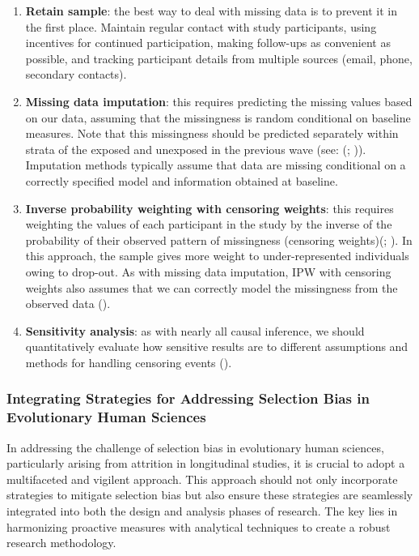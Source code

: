 \documentclass[
  singlecolumn,
  9pt]{article}
\begin{document}
\begin{enumerate}
\def\labelenumi{\arabic{enumi}.}
\item
  \textbf{Retain sample}: the best way to deal with missing data is to
  prevent it in the first place. Maintain regular contact with study
  participants, using incentives for continued participation, making
  follow-ups as convenient as possible, and tracking participant details
  from multiple sources (email, phone, secondary contacts).
\item
  \textbf{Missing data imputation}: this requires predicting the missing
  values based on our data, assuming that the missingness is random
  conditional on baseline measures. Note that this missingness should be
  predicted separately within strata of the exposed and unexposed in the
  previous wave (see: (; )).
  Imputation methods typically assume that data are missing conditional
  on a correctly specified model and information obtained at baseline.
\item
  \textbf{Inverse probability weighting with censoring weights}: this
  requires weighting the values of each participant in the study by the
  inverse of the probability of their observed pattern of missingness
  (censoring weights)(;
  ). In this approach, the
  sample gives more weight to under-represented individuals owing to
  drop-out. As with missing data imputation, IPW with censoring weights
  also assumes that we can correctly model the missingness from the
  observed data ().
\item
  \textbf{Sensitivity analysis}: as with nearly all causal inference, we
  should quantitatively evaluate how sensitive results are to different
  assumptions and methods for handling censoring events
  ().
\end{enumerate}

\subsubsection{Integrating Strategies for Addressing Selection Bias in
Evolutionary Human
Sciences}\label{integrating-strategies-for-addressing-selection-bias-in-evolutionary-human-sciences}

In addressing the challenge of selection bias in evolutionary human
sciences, particularly arising from attrition in longitudinal studies,
it is crucial to adopt a multifaceted and vigilent approach. This
approach should not only incorporate strategies to mitigate selection
bias but also ensure these strategies are seamlessly integrated into
both the design and analysis phases of research. The key lies in
harmonizing proactive measures with analytical techniques to create a
robust research methodology.
\end{document}
